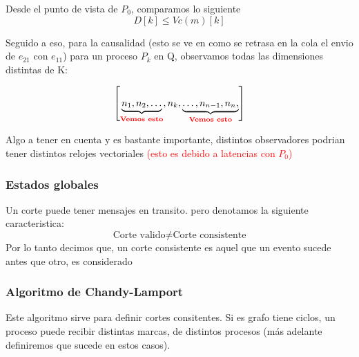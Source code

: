 Desde el punto de vista de $P_0$, comparamos lo siguiente
\[
  D[k]\leq Vc(m)[k]
\]

Seguido a eso, para la causalidad (esto se ve en como se retrasa en la cola el envio de $e_{21}$ con $e_{11}$) para un proceso $P_k$ en Q, observamos todas las dimensiones distintas de K:

\[
  \left[   \underbrace{n_1, n_2, \dots}_{\textcolor{red}{\textbf{Vemos esto}}}, n_k ,\underbrace{\dots,n_{n-1}, n_{n},}_{\textcolor{red}{\textbf{Vemos esto}}}   \right] 
\]

Algo a tener en cuenta y es bastante importante, distintos observadores podrian tener distintos relojes vectoriales \textcolor{red}{(esto es debido a latencias con $P_0$)}


\subsubsection{Estados globales}
Un corte puede tener mensajes en transito. pero denotamos la siguiente caracteristica:
\[
    \text{Corte valido} \neq \text{Corte consistente}
\]
Por lo tanto decimos que, un corte consistente es aquel que un evento sucede antes que otro, es considerado

\subsubsection{Algoritmo de Chandy-Lamport}
Este algoritmo sirve para definir cortes consitentes. Si es grafo tiene ciclos, un proceso puede recibir distintas marcas, de distintos procesos (más adelante definiremos que sucede en estos casos).

